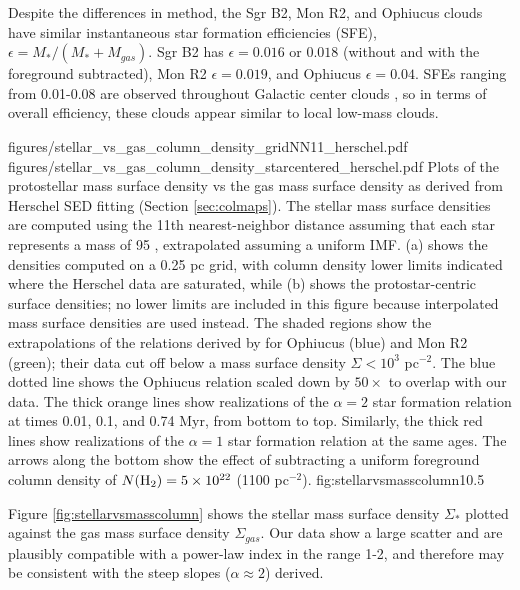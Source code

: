 \documentclass[twocolumn]{aastex61}
\begin{document}
Despite the differences in method, the Sgr B2, Mon R2, and Ophiucus clouds have
similar instantaneous star formation efficiencies (SFE), $\epsilon =
M_*/(M_*+M_{gas})$.  Sgr B2 has $\epsilon=0.016$ or $0.018$ (without and with
the foreground subtracted), Mon R2 $\epsilon=0.019$, and Ophiucus $\epsilon
= 0.04$.  SFEs ranging from 0.01-0.08 are observed throughout Galactic center
clouds \citep{Barnes2017b}, so in terms of overall efficiency, these clouds
appear similar to local low-mass clouds.


\FigureTwo
{figures/stellar_vs_gas_column_density_gridNN11_herschel.pdf}
{figures/stellar_vs_gas_column_density_starcentered_herschel.pdf}
{Plots of the protostellar mass surface density vs the gas mass surface density
as derived from Herschel SED fitting (Section \ref{sec:colmaps}).  The stellar
mass surface densities are computed using the 11th
nearest-neighbor distance assuming that each star represents
a mass of 95 \msun, extrapolated assuming a uniform IMF.  (a) shows the
densities computed on a 0.25 pc grid, with column density lower limits
indicated where the Herschel data are saturated,
while (b) shows
the protostar-centric surface densities; no lower limits are included in this
figure because interpolated mass surface densities are used instead.  The
shaded regions
show the extrapolations of the relations derived by \citet{Gutermuth2011a}
for Ophiucus (blue) and Mon R2 (green); their data cut off below a mass
surface density $\Sigma < 10^3$ \msun pc$^{-2}$. 
The blue dotted line shows the Ophiucus relation scaled down by
$50\times$ to overlap with our data.
The thick orange lines show realizations of the \citet{Gutermuth2011a} $\alpha=2$ star
formation relation at times 0.01, 0.1, and 0.74 Myr, from bottom to top.
Similarly, the thick red lines show realizations of the $\alpha=1$ star
formation relation at the same ages.
The arrows along
the bottom show the effect of subtracting a uniform foreground column
density of $N(\textrm{H}_{2})=5\times10^{22}$ \persc (1100 \msun pc$^{-2}$).
}
{fig:stellarvsmasscolumn}{1}{0.5\textwidth}

Figure \ref{fig:stellarvsmasscolumn} shows the stellar mass surface density
$\Sigma_*$ plotted against the gas mass surface density $\Sigma_{gas}$.
Our data show a large scatter and are plausibly compatible with a
power-law index in the range 1-2, and therefore may be consistent with the
steep slopes ($\alpha\approx2$) \citet{Gutermuth2011a} derived.
\end{document}

